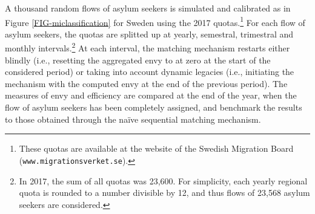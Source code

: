 \documentclass[12pt,fleqn]{article}
\begin{document}
A thousand random flows of asylum seekers is simulated and calibrated as in Figure \ref{FIG-miclassification} for Sweden using the 2017 quotas.\footnote{These quotas are available at the website of the Swedish Migration Board (\texttt{www.migrationsverket.se}).} For each flow of asylum seekers, the quotas are splitted up at yearly, semestral, trimestral and monthly intervals.\footnote{In 2017, the sum of all quotas was 23,600. For simplicity, each yearly regional quota is rounded to a number divisible by 12, and thus flows of 23,568 asylum seekers are considered.} At each interval, the matching mechanism restarts either blindly (i.e., resetting the aggregated envy to at zero at the start of the considered period) or taking into account dynamic legacies (i.e., initiating the mechanism with the computed envy at the end of the previous period). The measures of envy and efficiency are compared at the end of the year, when the flow of asylum seekers has been completely assigned, and benchmark the results to those obtained through the na\"{i}ve sequential matching mechanism.
\end{document}

